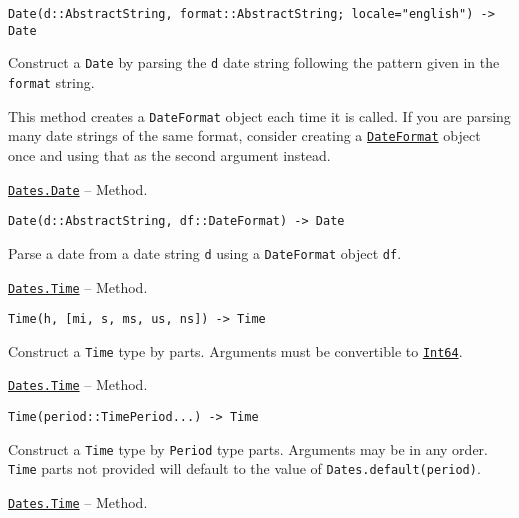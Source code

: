 \begin{adjustwidth}{2em}{0pt}


\begin{verbatim}
Date(d::AbstractString, format::AbstractString; locale="english") -> Date
\end{verbatim}

Construct a \texttt{Date} by parsing the \texttt{d} date string following the pattern given in the \texttt{format} string.

This method creates a \texttt{DateFormat} object each time it is called. If you are parsing many date strings of the same format, consider creating a \hyperlink{18093459443158853001}{\texttt{DateFormat}} object once and using that as the second argument instead.



\end{adjustwidth}
\hypertarget{10945442581319807702}{} 
\hyperlink{10945442581319807702}{\texttt{Dates.Date}}  -- {Method.}

\begin{adjustwidth}{2em}{0pt}


\begin{verbatim}
Date(d::AbstractString, df::DateFormat) -> Date
\end{verbatim}

Parse a date from a date string \texttt{d} using a \texttt{DateFormat} object \texttt{df}.



\end{adjustwidth}
\hypertarget{12389382980626687194}{} 
\hyperlink{12389382980626687194}{\texttt{Dates.Time}}  -- {Method.}

\begin{adjustwidth}{2em}{0pt}


\begin{verbatim}
Time(h, [mi, s, ms, us, ns]) -> Time
\end{verbatim}

Construct a \texttt{Time} type by parts. Arguments must be convertible to \hyperlink{7720564657383125058}{\texttt{Int64}}.



\end{adjustwidth}
\hypertarget{2540456868150513770}{} 
\hyperlink{2540456868150513770}{\texttt{Dates.Time}}  -- {Method.}

\begin{adjustwidth}{2em}{0pt}


\begin{verbatim}
Time(period::TimePeriod...) -> Time
\end{verbatim}

Construct a \texttt{Time} type by \texttt{Period} type parts. Arguments may be in any order. \texttt{Time} parts not provided will default to the value of \texttt{Dates.default(period)}.



\end{adjustwidth}
\hypertarget{10615626888769753904}{} 
\hyperlink{10615626888769753904}{\texttt{Dates.Time}}  -- {Method.}


